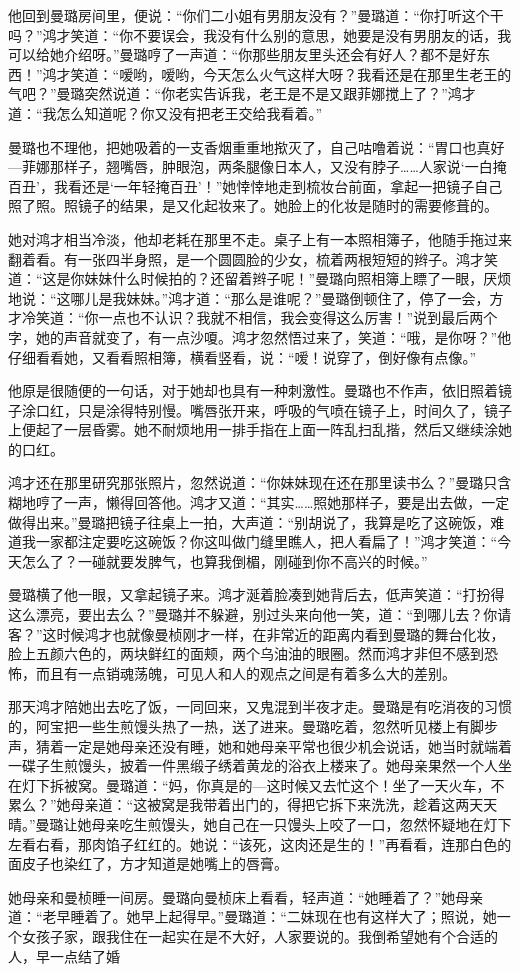 \par 他回到曼璐房间里，便说：“你们二小姐有男朋友没有？”曼璐道：“你打听这个干吗？”鸿才笑道：“你不要误会，我没有什么别的意思，她要是没有男朋友的话，我可以给她介绍呀。”曼璐哼了一声道：“你那些朋友里头还会有好人？都不是好东西！”鸿才笑道：“嗳哟，嗳哟，今天怎么火气这样大呀？我看还是在那里生老王的气吧？”曼璐突然说道：“你老实告诉我，老王是不是又跟菲娜搅上了？”鸿才道：“我怎么知道呢？你又没有把老王交给我看着。”
\par 曼璐也不理他，把她吸着的一支香烟重重地揿灭了，自己咕噜着说：“胃口也真好—菲娜那样子，翘嘴唇，肿眼泡，两条腿像日本人，又没有脖子……人家说‘一白掩百丑’，我看还是‘一年轻掩百丑’！”她悻悻地走到梳妆台前面，拿起一把镜子自己照了照。照镜子的结果，是又化起妆来了。她脸上的化妆是随时的需要修葺的。
\par 她对鸿才相当冷淡，他却老耗在那里不走。桌子上有一本照相簿子，他随手拖过来翻着看。有一张四半身照，是一个圆圆脸的少女，梳着两根短短的辫子。鸿才笑道：“这是你妹妹什么时候拍的？还留着辫子呢！”曼璐向照相簿上瞟了一眼，厌烦地说：“这哪儿是我妹妹。”鸿才道：“那么是谁呢？”曼璐倒顿住了，停了一会，方才冷笑道：“你一点也不认识？我就不相信，我会变得这么厉害！”说到最后两个字，她的声音就变了，有一点沙嗄。鸿才忽然悟过来了，笑道：“哦，是你呀？”他仔细看看她，又看看照相簿，横看竖看，说：“嗳！说穿了，倒好像有点像。”
\par 他原是很随便的一句话，对于她却也具有一种刺激性。曼璐也不作声，依旧照着镜子涂口红，只是涂得特别慢。嘴唇张开来，呼吸的气喷在镜子上，时间久了，镜子上便起了一层昏雾。她不耐烦地用一排手指在上面一阵乱扫乱揩，然后又继续涂她的口红。
\par 鸿才还在那里研究那张照片，忽然说道：“你妹妹现在还在那里读书么？”曼璐只含糊地哼了一声，懒得回答他。鸿才又道：“其实……照她那样子，要是出去做，一定做得出来。”曼璐把镜子往桌上一拍，大声道：“别胡说了，我算是吃了这碗饭，难道我一家都注定要吃这碗饭？你这叫做门缝里瞧人，把人看扁了！”鸿才笑道：“今天怎么了？一碰就要发脾气，也算我倒楣，刚碰到你不高兴的时候。”
\par 曼璐横了他一眼，又拿起镜子来。鸿才涎着脸凑到她背后去，低声笑道：“打扮得这么漂亮，要出去么？”曼璐并不躲避，别过头来向他一笑，道：“到哪儿去？你请客？”这时候鸿才也就像曼桢刚才一样，在非常近的距离内看到曼璐的舞台化妆，脸上五颜六色的，两块鲜红的面颊，两个乌油油的眼圈。然而鸿才非但不感到恐怖，而且有一点销魂荡魄，可见人和人的观点之间是有着多么大的差别。
\par 那天鸿才陪她出去吃了饭，一同回来，又鬼混到半夜才走。曼璐是有吃消夜的习惯的，阿宝把一些生煎馒头热了一热，送了进来。曼璐吃着，忽然听见楼上有脚步声，猜着一定是她母亲还没有睡，她和她母亲平常也很少机会说话，她当时就端着一碟子生煎馒头，披着一件黑缎子绣着黄龙的浴衣上楼来了。她母亲果然一个人坐在灯下拆被窝。曼璐道：“妈，你真是的—这时候又去忙这个！坐了一天火车，不累么？”她母亲道：“这被窝是我带着出门的，得把它拆下来洗洗，趁着这两天天晴。”曼璐让她母亲吃生煎馒头，她自己在一只馒头上咬了一口，忽然怀疑地在灯下左看右看，那肉馅子红红的。她说：“该死，这肉还是生的！”再看看，连那白色的面皮子也染红了，方才知道是她嘴上的唇膏。
\par 她母亲和曼桢睡一间房。曼璐向曼桢床上看看，轻声道：“她睡着了？”她母亲道：“老早睡着了。她早上起得早。”曼璐道：“二妹现在也有这样大了；照说，她一个女孩子家，跟我住在一起实在是不大好，人家要说的。我倒希望她有个合适的人，早一点结了婚


